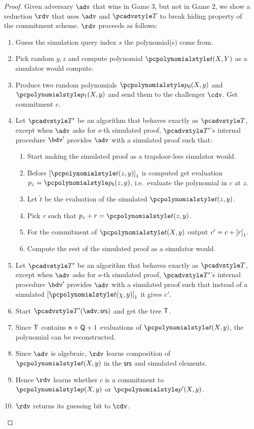 \documentclass[runningheads,11pt]{llncs}
\begin{document}
\begin{proof}
   Given adversary $\adv$ that wins in Game 3, but not
  in Game 2, we show a reduction $\rdv$ that uses $\adv$ and $\tdv$ to break
  hiding property of the commitment scheme. $\rdv$ proceeds as follows:
  \begin{enumerate}
  \item Guess the simulation query index $s$ the polynomial(s) come from.
  \item Pick random $y, z$ and compute polynomial $\p{t} (X, Y)$ as a simulator
    would compute.
  \item Produce two random polynomials $\p{p_0} (X, y)$ and $\p{p_1} (X, y)$ and
    send them to the challenger $\cdv$. Get commitment $c$.
  \item Let $\tdv'$ be an algorithm that behaves exactly as $\tdv$, except when
    $\adv$ asks for $s$-th simulated proof, $\tdv'$'s internal procedure $\bdv'$
    provides $\adv$ with a simulated proof such that:
    \begin{enumerate}
    \item Start making the simulated proof as a trapdoor-less simulator would.
    \item Before $\gone{\p{t} (z , y)}$ is computed
      get evaluation $p_z = \p{p_b} (z, y)$, i.e.~evaluate the polynomial in
      $c$ at $z$. 
    \item Let $\tilde{t}$ be the evaluation of the simulated $\p{t} (z, y)$.
    \item Pick $r$ such that $p_z + r = \p{t} (z, y)$.
    \item For the commitment of $\p{t} (X, y)$ output $c' = c + \left[r\right]_{1}$.
    \item Compute the rest of the simulated proof as a simulator would.
    \end{enumerate}
  \item Let $\tdv'$ be an algorithm that behaves exactly as $\tdv$, except when
    $\adv$ asks for $s$-th simulated proof, $\tdv'$'s internal procedure $\bdv'$
    provides $\adv$ with a simulated proof such that instead of a simulated
    $\gone{\p{t} (\chi, y)}$ it gives $c'$.
  \item Start $\tdv'(\adv, \srs)$ and get the tree $\mathsf{T}$.
  \item Since $\mathsf{T}$ contains $\mathsf{n} + \mathsf{Q} + 1$ evaluations of
    $\p{t} (X, y)$, the polynomial can be reconstructed.
  \item Since $\adv$ is algebraic, $\rdv$ learns composition of $\p{t} (X, y)$ in
    the $\mathsf{srs}$ and simulated elements. 
  \item Hence $\rdv$ learns whether $c$ is a commitment to $\p{p} (X, y)$ or
    $\p{p'} (X, y)$.
  \item $\rdv$ returns its guessing bit to $\cdv$.
  \end{enumerate}
 \end{proof}
\end{document}
